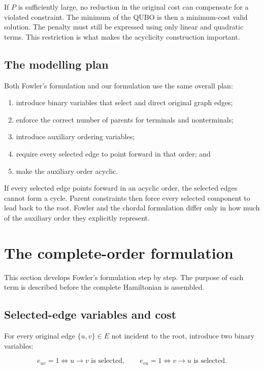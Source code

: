 \documentclass[10pt,a4paper]{article}
\begin{document}
If $P$ is sufficiently large, no reduction in the original cost can compensate
for a violated constraint. The minimum of the QUBO is then a minimum-cost
valid solution. The penalty must still be expressed using only linear and
quadratic terms. This restriction is what makes the acyclicity construction
important.

\subsection{The modelling plan}

Both Fowler's formulation and our formulation use the same overall plan:

\begin{enumerate}
  \item introduce binary variables that select and direct original graph edges;
  \item enforce the correct number of parents for terminals and nonterminals;
  \item introduce auxiliary ordering variables;
  \item require every selected edge to point forward in that order; and
  \item make the auxiliary order acyclic.
\end{enumerate}

If every selected edge points forward in an acyclic order, the selected edges
cannot form a cycle. Parent constraints then force every selected component to
lead back to the root. Fowler and the chordal formulation differ only in how
much of the auxiliary order they explicitly represent.

\section{The complete-order formulation}

This section develops Fowler's formulation step by step. The purpose of each
term is described before the complete Hamiltonian is assembled.

\subsection{Selected-edge variables and cost}

For every original edge $\{u,v\}\in E$ not incident to the root, introduce
two binary variables:

\[
e_{uv}=1 \Longleftrightarrow u\to v \text{ is selected},
\qquad
e_{vu}=1 \Longleftrightarrow v\to u \text{ is selected}.
\]
\end{document}
